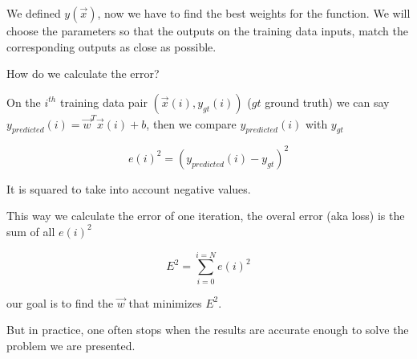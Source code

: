 \documentclass[twocolumn]{article}
\begin{document}
We defined $y(\vec{x})$, now we have to find the best weights for the function.
We will choose the parameters so that the outputs on the training data inputs,
match the corresponding outputs as close as possible.

How do we calculate the error? 

On the $i^{th}$ training data pair $(\vec{x}(i), y_{gt}(i))$ ($gt$ ground
truth) we can say $y_{predicted}(i) = \vec{w}^{T}\vec{x}(i) + b$, then we
compare
$y_{predicted}(i)$ with $y_{gt}$

\begin{equation}
    e(i)^2 = (y_{predicted}(i) - y_{gt})^2
\end{equation}

It is squared to take into account negative values.

This way we calculate the error of one iteration, the overal error (aka loss)
is the sum of all $e(i)^2$

\begin{equation}
    E^2 = \sum_{i=0}^{i=N} e(i)^2
\end{equation}

our goal is to find the $\vec{w}$ that minimizes $E^2$.

But in practice, one often stops when the results are accurate enough to solve
the problem we are presented.
\end{document}
